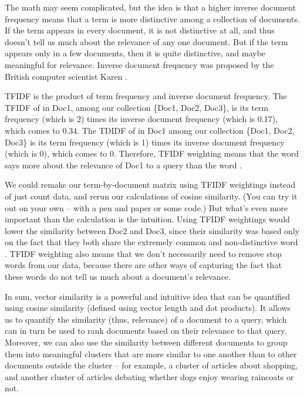 The math may seem complicated, but the idea is that a higher inverse document frequency means that a term is more distinctive among a collection of documents.  If the term appears in every document, it is not distinctive at all, and thus doesn't tell us much about the relevance of any one document.  But if the term appears only in a few documents, then it is quite distinctive, and maybe meaningful for relevance.  Inverse document frequency was proposed by the British computer scientist Karen \citet{SparckJones:1972}. 

TFIDF is the product of term frequency and inverse document frequency.  The TFIDF of  in Doc1, among our collection \{Doc1, Doc2, Doc3\}, is its term frequency (which is 2) times its inverse document frequency (which is 0.17), which comes to 0.34.  The TDIDF of  in Doc1 among our collection \{Doc1, Doc2, Doc3\} is  its term frequency (which is 1) times its inverse document frequency (which is 0), which comes to 0.  Therefore, TFIDF weighting means that the word  says more about the relevance of Doc1 to a query than the word .

We could remake our term-by-document matrix using TFIDF weightings instead of just count data, and rerun our calculations of cosine similarity.  (You can try it out on your own -- with a pen and paper or some code.)  But what's even more important than the calculation is the intuition.  Using TFIDF weightings would lower the similarity between Doc2 and Doc3, since their similarity was based only on the fact that they both share the extremely common and non-distinctive word .  TFIDF weighting also means that we don't necessarily need to remove stop words from our data, because there are other ways of capturing the fact that these words do not tell us much about a document's relevance. 

In sum, vector similarity is a powerful and intuitive idea that can be quantified using cosine similarity (defined using vector length and dot products).  It allows us to quantify the similarity (thus, relevance) of a document to a query, which can in turn be used to rank documents based on their relevance to that query.  Moreover, we can also use the similarity between different documents to group them into meaningful clusters that are more similar to one another than to other documents outside the cluster -- for example, a cluster of articles about shopping, and another cluster of articles debating whether dogs enjoy wearing raincoats or not.

